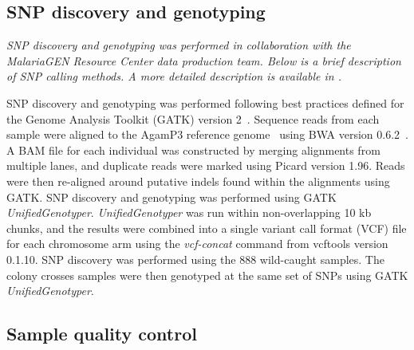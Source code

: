 \begin{refsection}
\begin{table}[t]
\begin{center}
\begin{threeparttable}
\end{threeparttable}
\end{center}
\end{table}


\subsection{SNP discovery and genotyping}\label{subsec:snp-discovery-and-genotyping}


\textit{SNP discovery and genotyping was performed in collaboration with the MalariaGEN Resource Center data production team. Below is a brief description of SNP calling methods. A more detailed description is available in \textcite{Ag1000G2017}.}


SNP discovery and genotyping was performed following best practices defined for the Genome Analysis Toolkit (GATK) version 2~\parencite{McKenna2010,Depristo2011,VanderAuwera2013}.
%
Sequence reads from each sample were aligned to the AgamP3 reference genome~\parencite{Holt2002,Sharakhova2007} using BWA version 0.6.2~\parencite{Li2009}.
%
A BAM file for each individual was constructed by merging alignments from multiple lanes, and duplicate reads were marked using Picard version 1.96.
%
Reads were then re-aligned around putative indels found within the alignments using GATK.
%
SNP discovery and genotyping was performed using GATK \textit{UnifiedGenotyper}.
%
\textit{UnifiedGenotyper} was run within non-overlapping 10 kb chunks, and the results were combined into a single variant call format (VCF) file for each chromosome arm using the \textit{vcf-concat} command from vcftools version 0.1.10.
%
SNP discovery was performed using the 888 wild-caught samples.
%
The colony crosses samples were then genotyped at the same set of SNPs using GATK \textit{UnifiedGenotyper}.


\subsection{Sample quality control}\label{subsec:sample-quality-control}



\end{refsection}
